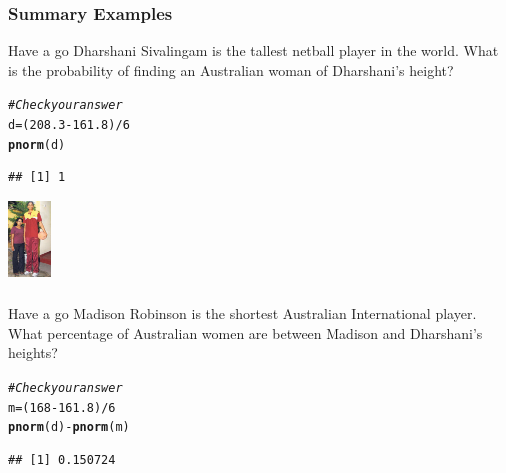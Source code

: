 \documentclass[t,xcolor=pdftex,dvipsnames,table]{beamer}\usepackage[]{graphicx}\usepackage[]{color}
\makeatletter
\newcommand{\hlnum}[1]{\textcolor[rgb]{0.686,0.059,0.569}{#1}}%
\newcommand{\hlcom}[1]{\textcolor[rgb]{0.678,0.584,0.686}{\textit{#1}}}%
\newcommand{\hlopt}[1]{\textcolor[rgb]{0,0,0}{#1}}%
\newcommand{\hlstd}[1]{\textcolor[rgb]{0.345,0.345,0.345}{#1}}%
\newcommand{\hlkwb}[1]{\textcolor[rgb]{0.69,0.353,0.396}{#1}}%
\newcommand{\hlkwd}[1]{\textcolor[rgb]{0.737,0.353,0.396}{\textbf{#1}}}%
\newenvironment{kframe}{%
 \def\at@end@of@kframe{}%
 \ifinner\ifhmode%
  \def\at@end@of@kframe{\end{minipage}}%
  \begin{minipage}{\columnwidth}%
 \fi\fi%
 \def\FrameCommand##1{\hskip\@totalleftmargin \hskip-\fboxsep
 \colorbox{shadecolor}{##1}\hskip-\fboxsep
     \hskip-\linewidth \hskip-\@totalleftmargin \hskip\columnwidth}%
 \MakeFramed {\advance\hsize-\width
   \@totalleftmargin\z@ \linewidth\hsize
   \@setminipage}}%
 {\par\unskip\endMakeFramed%
 \at@end@of@kframe}
\newenvironment{knitrout}{}{} %
\makeatother
\begin{document}
\begin{frame}[fragile]\frametitle{Summary Examples}

\begin{alertblock}{Have a go}
Dharshani Sivalingam is the tallest netball player in the world. What is the probability of finding an Australian woman of Dharshani’s height?

\href{http://www.thetallestman.com/dharshanisivalingam.htm}{}
\end{alertblock}

\begin{knitrout}
\color{fgcolor}\begin{kframe}
\begin{alltt}
\hlcom{#Check your answer}
\hlstd{d}\hlkwb{=}\hlstd{(}\hlnum{208.3} \hlopt{-} \hlnum{161.8}\hlstd{)}\hlopt{/}\hlnum{6}
\hlkwd{pnorm}\hlstd{(d)}
\end{alltt}
\begin{verbatim}
## [1] 1
\end{verbatim}
\end{kframe}
\end{knitrout}

\begin{center}
\includegraphics[height=2cm]{../images/Dharshani.jpg}
\end{center}

\end{frame}

\begin{frame}[fragile]\frametitle{}

\begin{alertblock}{Have a go}
Madison Robinson is the shortest Australian International player. What percentage of Australian women are between Madison and Dharshani’s heights?

\href{https://en.wikipedia.org/wiki/Madison Robinson}{}

\end{alertblock}

\begin{knitrout}
\color{fgcolor}\begin{kframe}
\begin{alltt}
\hlcom{#Check your answer}
\hlstd{m}\hlkwb{=}\hlstd{(}\hlnum{168} \hlopt{-} \hlnum{161.8}\hlstd{)}\hlopt{/}\hlnum{6}
\hlkwd{pnorm}\hlstd{(d)}\hlopt{-}\hlkwd{pnorm}\hlstd{(m)}
\end{alltt}
\begin{verbatim}
## [1] 0.150724
\end{verbatim}
\end{kframe}
\end{knitrout}

\end{frame}
\end{document}
